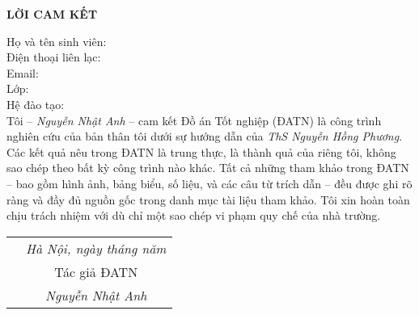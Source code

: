\documentclass[../DoAn.tex]{subfiles}
\begin{document}
\hfill
\begin{center}
    \LARGE\textbf{LỜI CAM KẾT}\\
\end{center}
\vspace{1cm}
Họ và tên sinh viên:\dotfill\\
Điện thoại liên lạc:\dotfill\\ Email:\dotfill\\
Lớp:\dotfill\\
Hệ đào tạo:\dotfill \\

\vspace{1cm}
Tôi – \emph{Nguyễn Nhật Anh} – cam kết Đồ án Tốt nghiệp (ĐATN) là công trình nghiên cứu của bản thân tôi dưới sự hướng dẫn của \emph{ThS Nguyễn Hồng Phương}. Các kết quả nêu trong ĐATN là trung thực, là thành quả của riêng tôi, không sao chép theo bất kỳ công trình nào khác. Tất cả những tham khảo trong ĐATN – bao gồm hình ảnh, bảng biểu, số liệu, và các câu từ trích dẫn – đều được ghi rõ ràng và đầy đủ nguồn gốc trong danh mục tài liệu tham khảo. Tôi xin hoàn toàn chịu trách nhiệm với dù chỉ một sao chép vi phạm quy chế của nhà trường.

\begin{table}[H]
\centering
\begin{tabular}{p{5cm} c}
\multicolumn{1}{c}{\textbf{}} &\emph{Hà Nội, ngày\hspace{0.5cm} tháng\hspace{0.5cm}   năm    }\vspace{0.4cm}\\
\textbf{}               & Tác giả ĐATN \vspace{3cm} \\

\textbf{}               & \emph{Nguyễn Nhật Anh}
\end{tabular}
\end{table}
\end{document}
